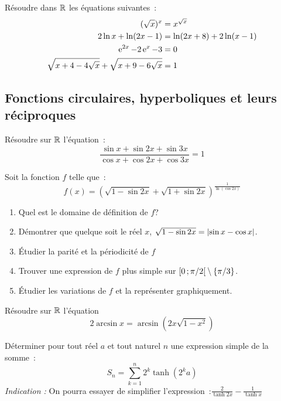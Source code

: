 \begin{exercice}
    Résoudre dans \(\mathbb{R}\) les équations suivantes~:
    \begin{align}
        (\sqrt{x})^x &= x^{\sqrt{x}} \\
        2\ln x + \ln(2x-1) &= \ln(2x+8) + 2\ln(x-1) \\
        \operatorname{e}^{2x} -2\operatorname{e}^x-3 &=0 \\
        \sqrt{x+4-4\sqrt{x}} + \sqrt{x+9-6\sqrt{x}} &= 1
    \end{align}
\end{exercice}
\subsection{Fonctions circulaires, hyperboliques et leurs réciproques}
\begin{exercice}
    Résoudre sur \(\mathbb{R}\) l'équation~:
    \begin{equation}
        \frac{\sin x + \sin 2x + \sin 3x}{\cos x + \cos 2x + \cos 3x} = 1
    \end{equation}
\end{exercice}
\begin{exercice}
    Soit la fonction \(f\) telle que~:
    \begin{equation}
        f(x) = (\sqrt{1-\sin 2x}+\sqrt{1+\sin 2x})^{\frac{1}{\ln(\cos 2x)}}
    \end{equation}
    \begin{enumerate}
        \item Quel est le domaine de définition de \(f\)?
        \item Démontrer que quelque soit le réel \(x\), \(\sqrt{1-\sin 
            2x}=\left\lvert\sin x - \cos x\right\rvert\).
        \item Étudier la parité et la périodicité de \(f\)
        \item Trouver une expression de \(f\) plus simple sur 
            \(\left[ 0 \, ;  \pi/2 \right[\setminus\{\pi/3\}\).
        \item Étudier les variations de \(f\) et la représenter graphiquement.
    \end{enumerate}
\end{exercice}
\begin{exercice}
    Résoudre sur \(\mathbb{R}\) l'équation
    \begin{equation}
        2\arcsin x = \arcsin(2x\sqrt{1-x^2})
    \end{equation}
\end{exercice}
\begin{exercice}
    Déterminer pour tout réel \(a\) et tout naturel \(n\) une expression simple 
    de la somme~:
    \begin{equation}
        S_n = \sum_{k=1}^n 2^k \tanh(2^k a)
    \end{equation}
    \emph{Indication :} On pourra essayer de simplifier 
    l'expression~:\(\frac{2}{\tanh 2x} - \frac{1}{\tanh x}\)
\end{exercice}
